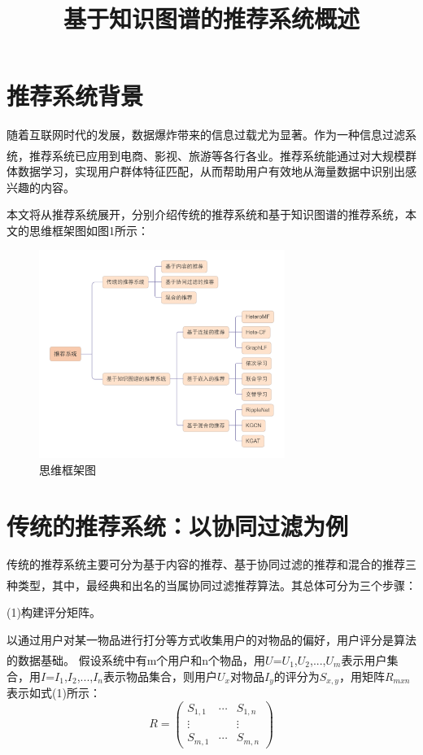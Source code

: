 \documentclass{article}
\title{\vspace{-3cm} \textbf{基于知识图谱的推荐系统概述}}
\date{}
\newcommand{\upcite}[1]{\textsuperscript{\textsuperscript{\cite{#1}}}}
\begin{document}
	\maketitle
	
	\vspace{-2cm}
	
	\section{推荐系统背景}
	随着互联网时代的发展，数据爆炸带来的信息过载尤为显著。作为一种信息过滤系统\upcite{1}，推荐系统已应用到电商、影视、旅游等各行各业。推荐系统能通过对大规模群体数据学习，实现用户群体特征匹配，从而帮助用户有效地从海量数据中识别出感兴趣的内容。 
	
	本文将从推荐系统展开，分别介绍传统的推荐系统和基于知识图谱的推荐系统，本文的思维框架图如图1所示：
	\begin{figure}[H]
	\centering
	\includegraphics[width=8cm]{pt3.png}%
	\vspace{-0.5cm}
	\caption{思维框架图} %
	\end{figure}
	
	\section{传统的推荐系统：以协同过滤为例}
	传统的推荐系统主要可分为基于内容的推荐、基于协同过滤的推荐和混合的推荐三种类型\upcite{1}，其中，最经典和出名的当属协同过滤推荐算法。其总体可分为三个步骤：
	
	(1)构建评分矩阵。
	
	以通过用户对某一物品进行打分等方式收集用户的对物品的偏好，用户评分是算法的数据基础\upcite{2}。
	假设系统中有m个用户和n个物品，用$U$={$U_1$,$U_2$,...,$U_m$}表示用户集合，用$I$={$I_1$,$I_2$,...,$I_n$}表示物品集合，则用户${U_x}$对物品${I_y}$的评分为${S_{x,y}}$，用矩阵${R_{mxn}}$表示如式(1)所示：
	\begin{equation}
	R=\left(\begin{array}{ccc}
	S_{1,1} & \cdots & S_{1, n} \\
	\vdots & & \vdots \\
	S_{m, 1} & \cdots & S_{m, n}
	\end{array}\right)
	\end{equation}
	
\end{document}
